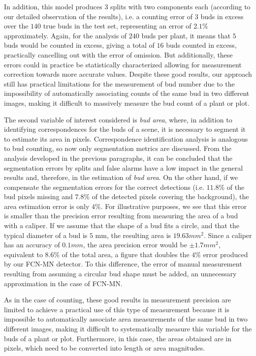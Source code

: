 \documentclass[a4paper,authoryear,review]{elsarticle}
\begin{document}
	In addition, this model produces $3$ splits with two components each (according to our detailed observation of the results), i.e. a counting error of $3$ buds in excess over the $140$ true buds in the test set, representing an error of $2.1\%$ approximately. Again, for the analysis of $240$ buds per plant, it means that $5$ buds would be counted in excess, giving a total of $16$ buds counted in excess, practically cancelling out with the error of omission. But additionally, these errors could in practice be statistically characterized allowing for measurement correction towards more accurate values. Despite these good results, our approach still has practical limitations for the measurement of bud number due to the impossibility of automatically associating counts of the same bud in two different images, making it difficult to massively measure the bud count of a plant or plot. 
	
	The second variable of interest considered is \emph{bud area}, where, in addition to identifying correspondences for the buds of a scene, it is necessary to segment it to estimate its area in pixels. Correspondence identification analysis is analogous to bud counting, so now only segmentation metrics are discussed. From the analysis developed in the previous paragraphs, it can be concluded that the segmentation errors by splits and false alarms have a low impact in the general results and, therefore, in the estimation of \emph{bud area}. On the other hand, if we compensate the segmentation errors for the correct detections (i.e. $11.8\%$ of the bud pixels missing and $7.8\%$ of the detected pixels covering the background), the area estimation error is only $4\%$. For illustrative purposes, we see that this error is smaller than the precision error resulting from measuring the area of a bud with a caliper. If we assume that the shape of a bud fits a circle, and that the typical diameter of a bud is $5$ mm, the resulting area is $19.63 mm^2$. Since a caliper has an accuracy of $0.1 mm$, the area precision error would be $\pm 1.7 mm^2$, equivalent to $8.6\%$ of the total area, a figure that doubles the $4\%$ error produced by our FCN-MN detector. To this difference,  the error of manual measurement resulting from assuming a circular bud shape must be added, an unnecessary approximation in the case of FCN-MN.
	
	As in the case of counting, these good results in measurement precision are limited to achieve a practical use of this type of measurement because it is impossible to automatically associate area measurements of the same bud in two different images, making it difficult to systematically measure this variable for the buds of a plant or plot. Furthermore, in this case, the areas obtained are in pixels, which need to be converted into length or area magnitudes.
	
\end{document}
